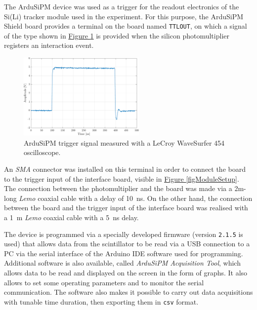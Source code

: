 \par
The ArduSiPM device was used as a trigger for the readout electronics of the Si(Li) tracker module used in the experiment. For this purpose, the ArduSiPM Shield board provides a terminal on the board named \texttt{TTLOUT}, on which a signal of the type shown in \hyperref[figArduiSiPMtrigger]{Figure \ref{figArduiSiPMtrigger}} is provided when the silicon photomultiplier registers an interaction event.

\begin{figure}[h!]
    \centering
    \includegraphics[width=0.55\textwidth]{Images/chap3/ArduSiPM_trigger.pdf}
    \caption{ArduSiPM trigger signal measured with a LeCroy WaveSurfer 454 oscilloscope.}
    \label{figArduiSiPMtrigger}
\end{figure}

\noindent
An \textit{SMA} connector was installed on this terminal in order to connect the board to the trigger input of the interface board, visible in \hyperref[figModuleSetup]{Figure \ref{figModuleSetup}}. The connection between the photomultiplier and the board was made via a 2m-long \textit{Lemo} coaxial cable with a delay of \SI{10}{\nano\second}. On the other hand, the connection between the board and the trigger input of the interface board was realised with a \SI{1}{\meter} \textit{Lemo} coaxial cable with a \SI{5}{\nano\second} delay.

\par
The device is programmed via a specially developed firmware (version \texttt{2.1.5} is used) that allows data from the scintillator to be read via a USB connection to a PC via the serial interface of the Arduino IDE software used for programming. Additional software is also available, called \textit{ArduSiPM Acquisition Tool}, which allows data to be read and displayed on the screen in the form of graphs. It also allows to set some operating parameters and to monitor the serial communication. The software also makes it possible to carry out data acquisitions with tunable time duration, then exporting them in \texttt{csv} format.

